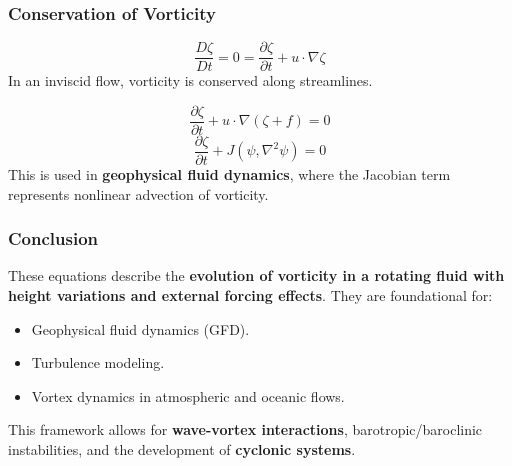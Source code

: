 \documentclass[12pt]{article}
\begin{document}
    \subsubsection*{Conservation of Vorticity}
    \begin{equation*}
        \frac{D \zeta}{D t}=0=\frac{\partial \zeta}{\partial t}+u \cdot \nabla \zeta
    \end{equation*}
    In an inviscid flow, vorticity is conserved along streamlines.

    \begin{equation*}
        \frac{\partial \zeta}{\partial t} + u \cdot \nabla(\zeta + f)=0
    \end{equation*}
    \begin{equation*}
        \frac{\partial \zeta}{\partial t}+J(\psi, \nabla^2 \psi)=0
    \end{equation*}
    This is used in \textbf{geophysical fluid dynamics}, where the Jacobian term represents nonlinear advection of vorticity.

    \subsubsection*{Conclusion}
    These equations describe the \textbf{evolution of vorticity in a rotating fluid with height variations and external forcing effects}. They are foundational for:
    \begin{itemize}
        \item Geophysical fluid dynamics (GFD).
        \item Turbulence modeling.
        \item Vortex dynamics in atmospheric and oceanic flows.
    \end{itemize}
    This framework allows for \textbf{wave-vortex interactions}, barotropic/baroclinic instabilities, and the development of \textbf{cyclonic systems}.

    \ifdefined\standalonechapter
    \else
    
    
    
\end{document}
